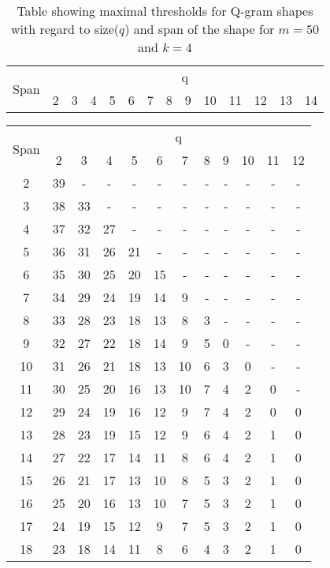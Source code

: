 \documentclass[paper=a4, fontsize=11pt]{scrartcl} %
\numberwithin{equation}{section} %
\numberwithin{figure}{section} %
\numberwithin{table}{section} %
\begin{document}
\begin{table}[H]
\centering
\begin{tabular} {|c|c|c|c|c|c|c|c|c|c|c|c|c|c|}
	\hline
	\multirow{ 2}{*}{Span} & \multicolumn{13}{|c|}{q} \\ 
	  & 2 &	3 & 4 &	5 & 6 & 7 & 8 & 9 &	10 & 11 & 12 & 13 & 14 \\ \hline
\end{tabular}
\caption{Table showing maximal thresholds for Q-gram shapes with regard to
size($q$) and span of the shape for $m=50$ and $k=4$}
\label{tab:res1}
\end{table}

\begin{table}[H]
\centering
\begin{tabular} {|c|c|c|c|c|c|c|c|c|c|c|c|}
	\hline
	\multirow{ 2}{*}{Span} & \multicolumn{11}{|c|}{q} \\ 
	  & 2 &	3 & 4 &	5 & 6 & 7 & 8 & 9 &	10 & 11 & 12 \\ \hline
	2 & 39 & - & - & - & - & - & - & - & - & - & - \\
	3 & 38 & 33 & - & - & - & - & - & - & - & - & - \\
	4 & 37 & 32 & 27 & - & - & - & - & - & - & - & - \\
	5 & 36 & 31 & 26 & 21 & - & - & - & - & - & - & - \\
	6 & 35 & 30 & 25 & 20 & 15 & - & - & - & - & - & - \\
	7 & 34 & 29 & 24 & 19 & 14 & 9 & - & - & - & - & - \\
	8 & 33 & 28 & 23 & 18 & 13 & 8 & 3 & - & - & - & - \\
	9 & 32 & 27 & 22 & 18 & 14 & 9 & 5 & 0 & - & - & - \\
	10 & 31 & 26 & 21 & 18 & 13 & 10 & 6 & 3 & 0 & - & - \\
	11 & 30 & 25 & 20 & 16 & 13 & 10 & 7 & 4 & 2 & 0 & - \\
	12 & 29 & 24 & 19 & 16 & 12 & 9 & 7 & 4 & 2 & 0 & 0 \\
	13 & 28 & 23 & 19 & 15 & 12 & 9 & 6 & 4 & 2 & 1 & 0 \\
	14 & 27 & 22 & 17 & 14 & 11 & 8 & 6 & 4 & 2 & 1 & 0 \\
	15 & 26 & 21 & 17 & 13 & 10 & 8 & 5 & 3 & 2 & 1 & 0 \\
	16 & 25 & 20 & 16 & 13 & 10 & 7 & 5 & 3 & 2 & 1 & 0 \\
	17 & 24 & 19 & 15 & 12 & 9 & 7 & 5 & 3 & 2 & 1 & 0 \\
	18 & 23 & 18 & 14 & 11 & 8 & 6 & 4 & 3 & 2 & 1 & 0 \\

\end{tabular}
\end{table}
\end{document}
